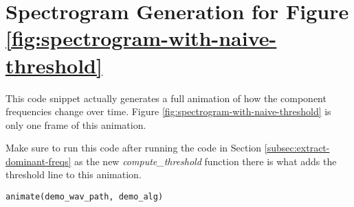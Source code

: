 \section{Spectrogram Generation for Figure \ref{fig:spectrogram-with-naive-threshold}}
\label{sec:code-spectrogram-with-naive-threshold}
This code snippet actually generates a full animation of how the component frequencies change over time.
Figure \ref{fig:spectrogram-with-naive-threshold} is only one frame of this animation.

Make sure to run this code after running the code in Section \ref{subsec:extract-dominant-freqs} as the new \emph{compute\_threshold} function there is what adds the threshold line to this animation.

\begin{verbatim}
animate(demo_wav_path, demo_alg)
\end{verbatim}
